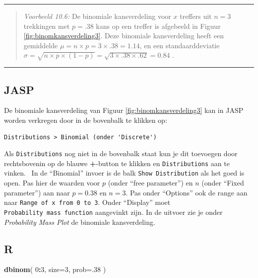 \documentclass[
]{book}
\newenvironment{Shaded}{\begin{snugshade}}{\end{snugshade}}
\newcommand{\AttributeTok}[1]{\textcolor[rgb]{0.13,0.29,0.53}{#1}}
\newcommand{\DecValTok}[1]{\textcolor[rgb]{0.00,0.00,0.81}{#1}}
\newcommand{\FunctionTok}[1]{\textcolor[rgb]{0.13,0.29,0.53}{\textbf{#1}}}
\newcommand{\NormalTok}[1]{#1}
\newcommand{\SpecialCharTok}[1]{\textcolor[rgb]{0.81,0.36,0.00}{\textbf{#1}}}
\begin{document}
\begin{center}\rule{0.5\linewidth}{0.5pt}\end{center}

\begin{quote}
\emph{Voorbeeld 10.6:}
De binomiale kansverdeling voor \(x\) treffers uit \(n=3\) trekkingen met
\(p=.38\) kans op een treffer is afgebeeld in
Figuur \ref{fig:binomkansverdeling3}. Deze binomiale kansverdeling heeft
een gemiddelde \(\mu=n \times p = 3 \times .38 = 1.14\), en een
standaarddeviatie
\(\sigma = \sqrt{n \times p \times (1-p)} = \sqrt{ 3 \times .38 \times .62} = 0.84\)
.
\end{quote}

\begin{center}\rule{0.5\linewidth}{0.5pt}\end{center}

\subsection{JASP}\label{jasp-4}

De binomiale kansverdeling van Figuur \ref{fig:binomkansverdeling3} kan in JASP worden verkregen door in de bovenbalk te klikken op:

\begin{verbatim}
Distributions > Binomial (onder 'Discrete')
\end{verbatim}

Als \texttt{Distributions} nog niet in de bovenbalk staat kun je dit toevoegen door rechtsbovenin op de blauwe \textbf{+}-button te klikken en \texttt{Distributions} aan te vinken.~
In de ``Binomial'' invoer is de balk \texttt{Show\ Distribution} als het goed is open. Pas hier de waarden voor \(p\) (onder ``free parameter'') en \(n\) (onder ``Fixed parameter'') aan naar \(p=0.38\) en \(n=3\). Pas onder ``Options'' ook de range aan naar \texttt{Range\ of\ x\ from\ 0\ to\ 3}. Onder ``Display'' moet \texttt{Probability\ mass\ function} aangevinkt zijn. In de uitvoer zie je onder \emph{Probability Mass Plot} de binomiale kansverdeling.

\subsection{R}\label{r-4}

\begin{Shaded}
\begin{Highlighting}[]
\FunctionTok{dbinom}\NormalTok{( }\DecValTok{0}\SpecialCharTok{:}\DecValTok{3}\NormalTok{, }\AttributeTok{size=}\DecValTok{3}\NormalTok{, }\AttributeTok{prob=}\NormalTok{.}\DecValTok{38}\NormalTok{ )}
\end{Highlighting}
\end{Shaded}
\end{document}
